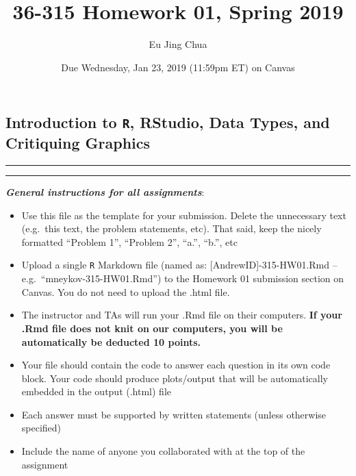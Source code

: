 \documentclass[]{article}
\title{36-315 Homework 01, Spring 2019}
\author{Eu Jing Chua}
\date{Due Wednesday, Jan 23, 2019 (11:59pm ET) on Canvas}
\providecommand{\tightlist}{%
  \setlength{\itemsep}{0pt}\setlength{\parskip}{0pt}}
\begin{document}
\maketitle

\hypertarget{introduction-to-r-rstudio-data-types-and-critiquing-graphics}{%
\subsection{\texorpdfstring{Introduction to \texttt{R}, RStudio, Data
Types, and Critiquing
Graphics}{Introduction to R, RStudio, Data Types, and Critiquing Graphics}}\label{introduction-to-r-rstudio-data-types-and-critiquing-graphics}}

\begin{center}\rule{0.5\linewidth}{\linethickness}\end{center}

\begin{center}\rule{0.5\linewidth}{\linethickness}\end{center}

\textbf{\emph{General instructions for all assignments}}:

\begin{itemize}
\tightlist
\item
  Use this file as the template for your submission. Delete the
  unnecessary text (e.g.~this text, the problem statements, etc). That
  said, keep the nicely formatted ``Problem 1'', ``Problem 2'', ``a.'',
  ``b.'', etc
\item
  Upload a single \texttt{R} Markdown file (named as:
  {[}AndrewID{]}-315-HW01.Rmd -- e.g.~``mneykov-315-HW01.Rmd'') to the
  Homework 01 submission section on Canvas. You do not need to upload
  the .html file.
\item
  The instructor and TAs will run your .Rmd file on their computers.
  \textbf{If your .Rmd file does not knit on our computers, you will be
  automatically be deducted 10 points.}
\item
  Your file should contain the code to answer each question in its own
  code block. Your code should produce plots/output that will be
  automatically embedded in the output (.html) file
\item
  Each answer must be supported by written statements (unless otherwise
  specified)
\item
  Include the name of anyone you collaborated with at the top of the
  assignment
\end{itemize}
\end{document}
